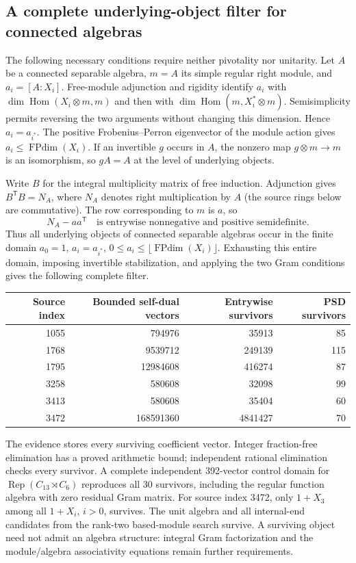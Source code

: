 \subsection{A complete underlying-object filter for connected algebras}

The following necessary conditions require neither pivotality nor unitarity.
Let $A$ be a connected separable algebra, $m=A$ its simple regular right
module, and $a_i=[A:X_i]$. Free-module adjunction and rigidity identify
$a_i$ with $\dim\operatorname{Hom}(X_i\otimes m,m)$ and then with
$\dim\operatorname{Hom}(m,X_i^*\otimes m)$. Semisimplicity permits reversing
the two arguments without changing this dimension. Hence $a_i=a_{i^*}$.
The positive Frobenius--Perron eigenvector of the module action gives
$a_i\leq\operatorname{FPdim}(X_i)$. If an invertible $g$ occurs in $A$,
the nonzero map $g\otimes m\longrightarrow m$ is an isomorphism, so
$gA=A$ at the level of underlying objects.

Write $B$ for the integral multiplicity matrix of free induction.
Adjunction gives $B^{\mathsf T}B=N_A$, where $N_A$ denotes right
multiplication by $A$ (the source rings below are commutative).
The row corresponding to $m$ is $a$, so
\[
 N_A-aa^{\mathsf T}\quad\text{is entrywise nonnegative and positive semidefinite.}
\]
Thus all underlying objects of connected separable algebras occur in the
finite domain $a_0=1$, $a_i=a_{i^*}$,
$0\leq a_i\leq\lfloor\operatorname{FPdim}(X_i)\rfloor$.
Exhausting this entire domain, imposing invertible stabilization, and
applying the two Gram conditions gives the following complete filter.

\begin{center}
\begin{tabular}{r|r|r|r}
Source index & Bounded self-dual vectors & Entrywise survivors & PSD survivors\\\hline
1055 & 794976 & 35913 & 85\\
1768 & 9539712 & 249139 & 115\\
1795 & 12984608 & 416274 & 87\\
3258 & 580608 & 32098 & 99\\
3413 & 580608 & 35404 & 60\\
3472 & 168591360 & 4841427 & 70
\end{tabular}
\end{center}

The evidence stores every surviving coefficient vector. Integer
fraction-free elimination has a proved arithmetic bound; independent
rational elimination checks every survivor. A complete independent
392-vector control domain for
$\operatorname{Rep}(C_{13}\rtimes C_6)$ reproduces all 30 survivors,
including the regular function algebra with zero residual Gram matrix.
For source index 3472, only $1+X_3$ among all $1+X_i$, $i>0$, survives.
The unit algebra and all internal-end candidates from the rank-two
based-module search survive. A surviving object need not admit an algebra
structure: integral Gram factorization and the module/algebra
associativity equations remain further requirements.

